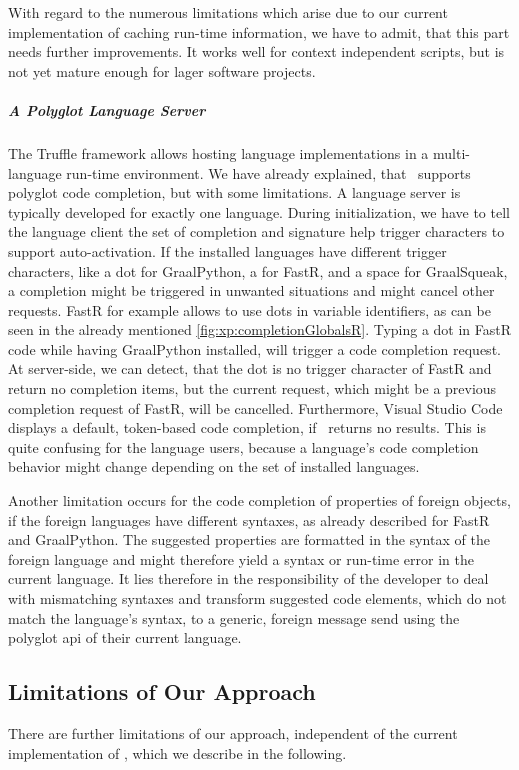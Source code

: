 With regard to the numerous limitations which arise due to our current implementation of caching run-time information, we have to admit, that this part needs further improvements. It works well for context independent scripts, but is not yet mature enough for lager software projects.

\subparagraph{A Polyglot Language Server}
The Truffle framework allows hosting language implementations in a multi-language run-time environment. We have already explained, that \graallsp~supports polyglot code completion, but with some limitations. A language server is typically developed for exactly one language. During initialization, we have to tell the language client the set of completion and signature help trigger characters to support auto-activation. If the installed languages have different trigger characters, like a dot for GraalPython, a \inlinecode{\$} for FastR, and a space for GraalSqueak, a completion might be triggered in unwanted situations and might cancel other requests. FastR for example allows to use dots in variable identifiers, as can be seen in the already mentioned \autoref{fig:xp:completionGlobalsR}. Typing a dot in FastR code while having GraalPython installed, will trigger a code completion request. At server-side, we can detect, that the dot is no trigger character of FastR and return no completion items, but the current request, which might be a previous completion request of FastR, will be cancelled. Furthermore, Visual Studio Code displays a default, token-based code completion, if \graallsp~returns no results. This is quite confusing for the language users, because a language's code completion behavior might change depending on the set of installed languages.

Another limitation occurs for the code completion of properties of foreign objects, if the foreign languages have different syntaxes, as already described for FastR and GraalPython. The suggested properties are formatted in the syntax of the foreign language and might therefore yield a syntax or run-time error in the current language. It lies therefore in the responsibility of the developer to deal with mismatching syntaxes and transform suggested code elements, which do not match the language's syntax, to a generic, foreign message send using the polyglot \ac{api} of their current language.



\subsection{Limitations of Our Approach}
There are further limitations of our approach, independent of the current implementation of \graallsp, which we describe in the following.

